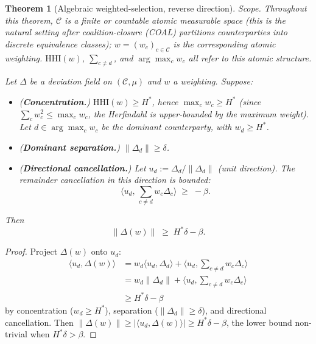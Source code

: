 \documentclass{article}
\newtheorem{theorem}{Theorem}
\newcommand{\HHI}{\mathrm{HHI}}
\begin{document}
\begin{theorem}[Algebraic weighted-selection, reverse direction]
\label{thm:reverse-v2}
\emph{Scope.}  Throughout this theorem, $\mathcal{C}$ is a finite
or countable atomic measurable space (this is the natural setting
after coalition-closure (COAL) partitions counterparties into
discrete equivalence classes); $w = (w_c)_{c \in \mathcal{C}}$ is
the corresponding atomic weighting.  $\HHI(w)$, $\sum_{c \neq d}$,
and $\arg\max_c w_c$ all refer to this atomic structure.

Let $\Delta$ be a deviation field on $(\mathcal{C}, \mu)$ and $w$
a weighting.  Suppose:
\begin{itemize}
\item (\textbf{Concentration.}) $\HHI(w) \geq H^*$, hence
  $\max_c w_c \geq H^*$ (since $\sum_c w_c^2 \leq \max_c w_c$, the
  Herfindahl is upper-bounded by the maximum weight).  Let $d \in
  \arg\max_c w_c$ be the dominant counterparty, with $w_d \geq
  H^*$.
\item (\textbf{Dominant separation.}) $\|\Delta_d\| \geq \delta$.
\item (\textbf{Directional cancellation.}) Let $u_d :=
  \Delta_d / \|\Delta_d\|$ (unit direction).  The remainder
  cancellation in this direction is bounded:
  \begin{equation}
    \langle u_d, \,\sum_{c \neq d} w_c \Delta_c\rangle \;\geq\;
    -\beta.
  \end{equation}
\end{itemize}

Then
\begin{equation}
\label{eq:reverse-bound-v2}
  \|\Delta(w)\| \;\geq\; H^* \delta - \beta.
\end{equation}
\end{theorem}

\begin{proof}
Project $\Delta(w)$ onto $u_d$:
\begin{align*}
  \langle u_d, \Delta(w)\rangle
  &= w_d \langle u_d, \Delta_d\rangle + \langle u_d,
    \sum_{c \neq d} w_c \Delta_c\rangle \\
  &= w_d \|\Delta_d\| + \langle u_d,
    \sum_{c \neq d} w_c \Delta_c\rangle \\
  &\geq H^* \delta - \beta
\end{align*}
by concentration ($w_d \geq H^*$), separation ($\|\Delta_d\| \geq
\delta$), and directional cancellation.  Then $\|\Delta(w)\| \geq
|\langle u_d, \Delta(w)\rangle| \geq H^* \delta - \beta$, the lower
bound non-trivial when $H^* \delta > \beta$.
\end{proof}
\end{document}
